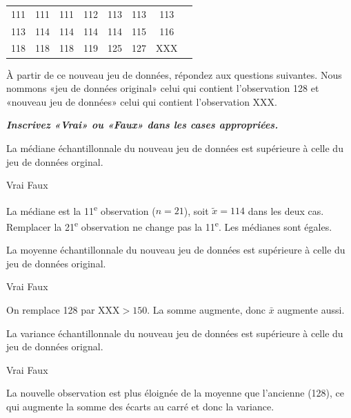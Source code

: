 \begin{questions}
\begin{parts}
\begin{center}
\begin{tabular}{  c c c c c c c c }
111  &111  &111  &112  &113  &113  &113 \\
113 &114  &114  &114  &114 &115 & 116 \\
118 & 118 & 118 & 119 & 125 &127 & XXX \\
\end{tabular}
\end{center}

À partir de ce nouveau jeu de données, répondez aux questions suivantes. Nous nommons «jeu de données original» celui qui contient l'observation 128 et «nouveau jeu de données» celui qui contient l'observation XXX.

\textbf{\textit{Inscrivez «Vrai» ou «Faux» dans les cases appropriées.}}

\begin{subparts}
\subpart[3]La médiane échantillonnale du nouveau jeu de données est supérieure à celle du jeu de données orginal.


    \begin{oneparcheckboxes}
        \choice Vrai
        \correctchoice Faux
    \end{oneparcheckboxes}
\begin{solution}
La médiane est la 11\textsuperscript{e} observation ($n=21$), soit $\tilde{x}=114$ dans les deux cas. Remplacer la 21\textsuperscript{e} observation ne change pas la 11\textsuperscript{e}. Les médianes sont égales.
\end{solution}

\subpart[3] La moyenne échantillonnale du nouveau jeu de données est supérieure à celle du jeu de données original.


    \begin{oneparcheckboxes}
        \correctchoice Vrai
        \choice Faux
    \end{oneparcheckboxes}
\begin{solution}
On remplace 128 par $\text{XXX} > 150$. La somme augmente, donc $\bar{x}$ augmente aussi.
\end{solution}

\subpart[3] La variance échantillonnale du nouveau jeu de données est supérieure à celle du jeu de données orignal.


    \begin{oneparcheckboxes}
        \correctchoice Vrai
        \choice Faux
    \end{oneparcheckboxes}
\begin{solution}
La nouvelle observation est plus éloignée de la moyenne que l'ancienne (128), ce qui augmente la somme des écarts au carré et donc la variance.
\end{solution}

\end{subparts}
\end{parts}

\end{questions}
 
